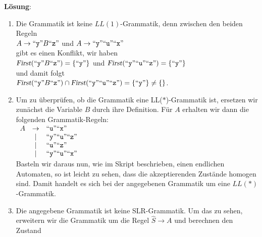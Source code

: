 \documentclass{article}
\newcommand{\solution}{
\vspace*{0.3cm}

\noindent
\textbf{L\"osung}: }
\newcommand{\quoted}[1]{\mbox{``\texttt{#1}''}}
\begin{document}
\solution
\begin{enumerate}
\item Die Grammatik ist keine $LL(1)$-Grammatik, denn zwischen den beiden Regeln
      \\[0.2cm]
      \hspace*{1.3cm}
      $A \rightarrow \quoted{y} B \quoted{z}$ \quad und \quad
      $A \rightarrow \quoted{y} \quoted{u} \quoted{x}$ 
      \\[0.2cm]
      gibt es einen Konflikt, wir haben
      \\[0.2cm]
      \hspace*{1.3cm}
      $\textsl{First}(\quoted{y} B \quoted{z}) = \{ \quoted{y} \}$ \quad und \quad
      $\textsl{First}(\quoted{y} \quoted{u} \quoted{z}) = \{ \quoted{y} \}$ 
      \\[0.2cm]
      und damit folgt
      \\[0.2cm]
      \hspace*{1.3cm}
      $\textsl{First}(\quoted{y} B \quoted{z}) \cap \textsl{First}(\quoted{y} \quoted{u} \quoted{z}) = 
      \{ \quoted{y} \} \not= \{\}$.
\item Um zu \"uberpr\"ufen, ob die Grammatik eine LL($*$)-Grammatik ist, ersetzen wir zun\"achst die Variable $B$ 
      durch ihre Definition.  F\"ur $A$ erhalten wir dann die folgenden Grammatik-Regeln:
      \\[0.2cm]
      \hspace*{1.3cm}
      $\begin{array}[t]{lcl}
        A & \rightarrow & \quoted{u} \quoted{x} \\
          & \mid        & \quoted{y} \quoted{u} \quoted{z} \\
          & \mid        & \quoted{u} \quoted{z} \\
          & \mid        & \quoted{y} \quoted{u} \quoted{x} 
        \end{array}
       $
      \\[0.2cm]
      Basteln wir daraus nun, wie im Skript beschrieben, einen endlichen Automaten, so ist leicht zu
      sehen, dass die akzeptierenden Zust\"ande homogen sind.  Damit handelt es sich bei der
      angegebenen Grammatik um eine $LL(*)$-Grammatik.
\item Die angegebene Grammatik ist keine SLR-Grammatik.  Um das zu sehen, erweitern wir die Grammatik
      um die Regel $\widehat{S} \rightarrow A$ und berechnen den Zustand
      \\[0.2cm]
      \hspace*{1.3cm}

\end{enumerate}
\end{document}
